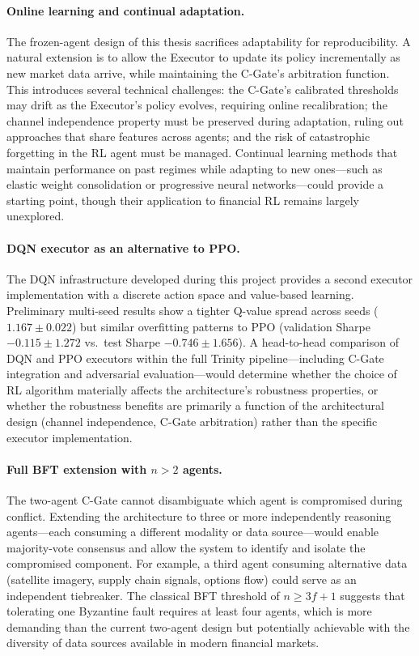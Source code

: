 \paragraph{Online learning and continual adaptation.}
The frozen-agent design of this thesis sacrifices adaptability for
reproducibility. A natural extension is to allow the Executor to update its
policy incrementally as new market data arrive, while maintaining the
C-Gate's arbitration function. This introduces several technical challenges:
the C-Gate's calibrated thresholds may drift as the Executor's policy
evolves, requiring online recalibration; the channel independence property
must be preserved during adaptation, ruling out approaches that share
features across agents; and the risk of catastrophic forgetting in the RL
agent must be managed. Continual learning methods that maintain performance
on past regimes while adapting to new ones---such as elastic weight
consolidation or progressive neural networks---could provide a starting
point, though their application to financial RL remains largely unexplored.

\paragraph{DQN executor as an alternative to PPO.}
The DQN infrastructure developed during this project provides a second
executor implementation with a discrete action space and value-based
learning. Preliminary multi-seed results show a tighter Q-value spread
across seeds ($1.167 \pm 0.022$) but similar overfitting patterns to PPO
(validation Sharpe $-0.115 \pm 1.272$ vs.\ test Sharpe $-0.746 \pm 1.656$).
A head-to-head comparison of DQN and PPO executors within the full Trinity
pipeline---including C-Gate integration and adversarial evaluation---would
determine whether the choice of RL algorithm materially affects the
architecture's robustness properties, or whether the robustness benefits are
primarily a function of the architectural design (channel independence, C-Gate
arbitration) rather than the specific executor implementation.

\paragraph{Full BFT extension with $n > 2$ agents.}
The two-agent C-Gate cannot disambiguate which agent is compromised during
conflict. Extending the architecture to three or more independently reasoning
agents---each consuming a different modality or data source---would enable
majority-vote consensus and allow the system to identify and isolate the
compromised component. For example, a third agent consuming alternative data
(satellite imagery, supply chain signals, options flow) could serve as an
independent tiebreaker. The classical BFT threshold of $n \geq 3f + 1$
\cite{castro1999pbft} suggests that tolerating one Byzantine fault requires
at least four agents, which is more demanding than the current two-agent
design but potentially achievable with the diversity of data sources
available in modern financial markets.

